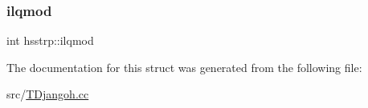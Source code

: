 \mbox{\label{structhsstrp_a55a031a78e620183149145fc74fdf934}} 
\subsubsection{\texorpdfstring{ilqmod}{ilqmod}}
{\footnotesize\ttfamily int hsstrp\+::ilqmod}



The documentation for this struct was generated from the following file\+:\begin{DoxyCompactItemize}
\item 
src/\hyperlink{_t_djangoh_8cc}{T\+Djangoh.\+cc}\end{DoxyCompactItemize}
